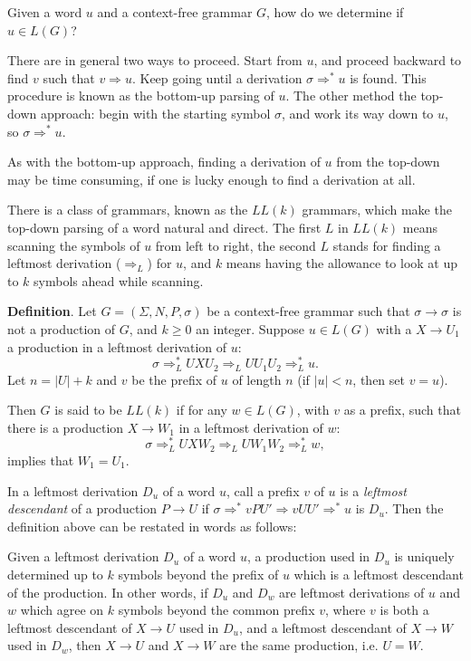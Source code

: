 \documentclass[12pt]{article}
\begin{document}
Given a word $u$ and a context-free grammar $G$, how do we determine if $u\in L(G)$?  

There are in general two ways to proceed.  Start from $u$, and proceed backward to find $v$ such that $v\Rightarrow u$.  Keep going until a derivation $\sigma\Rightarrow^* u$ is found.  This procedure is known as the bottom-up parsing of $u$.  The other method the top-down approach: begin with the starting symbol $\sigma$, and work its way down to $u$, so $\sigma\Rightarrow^* u$.  

As with the bottom-up approach, finding a derivation of $u$ from the top-down may be time consuming, if one is lucky enough to find a derivation at all.

There is a class of grammars, known as the $LL(k)$ grammars, which make the top-down parsing of a word natural and direct.  The first $L$ in $LL(k)$ means scanning the symbols of $u$ from left to right, the second $L$ stands for finding a leftmost derivation ($\Rightarrow_L$) for $u$, and $k$ means having the allowance to look at up to $k$ symbols ahead while scanning.

\textbf{Definition}.  Let $G=(\Sigma,N,P,\sigma)$ be a context-free grammar such that $\sigma\to \sigma$ is not a production of $G$, and $k\ge 0$ an integer.  Suppose $u\in L(G)$ with a $X\to U_1$ a production in a leftmost derivation of $u$:
$$\sigma \Rightarrow_L^* UXU_2 \Rightarrow_L UU_1U_2 \Rightarrow_L^* u.$$
Let $n=|U|+k$ and $v$ be the prefix of $u$ of length $n$ (if $|u|<n$, then set $v=u$).

Then $G$ is said to be $LL(k)$ if for any $w\in L(G)$, with $v$ as a prefix, such that there is a production $X\to W_1$ in a leftmost derivation of $w$: $$\sigma \Rightarrow_L^* UXW_2 \Rightarrow_L UW_1W_2 \Rightarrow_L^* w,$$
implies that $W_1=U_1$.

In a leftmost derivation $D_u$ of a word $u$, call a prefix $v$ of $u$ is a \emph{leftmost descendant} of a production $P\to U$ if $\sigma \Rightarrow^* vPU' \Rightarrow vUU' \Rightarrow^* u$ is $D_u$.  Then the definition above can be restated in words as follows:

Given a leftmost derivation $D_u$ of a word $u$, a production used in $D_u$ is uniquely determined up to $k$ symbols beyond the prefix of $u$ which is a leftmost descendant of the production.  In other words, if $D_u$ and $D_w$ are leftmost derivations of $u$ and $w$ which agree on $k$ symbols beyond the common prefix $v$, where $v$ is both a leftmost descendant of $X\to U$ used in $D_u$, and a leftmost descendant of $X\to W$ used in $D_w$, then $X\to U$ and $X\to W$ are the same production, i.e. $U=W$.
\end{document}
